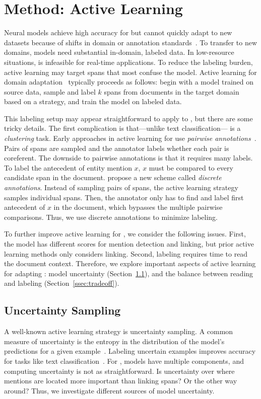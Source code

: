 \section{Method: Active Learning}
\label{sec:active}
Neural models achieve high accuracy for \ontonotes{} but cannot quickly
adapt to new datasets because of shifts in domain or
annotation standards~\citep{poot-2020}.
To transfer to new domains, models need substantial in-domain, labeled data.
In low-resource situations, \coref{} is infeasible for real-time
applications.
To reduce the labeling burden, active learning may
target spans that most confuse the model.
Active learning for domain adaptation~\citep{rai-2010} typically proceeds as follows:
begin with a model
trained on source data,
sample and label $k$ spans from
documents in the
target domain based on a strategy, and
train the model
on labeled data.

This labeling setup may appear straightforward to apply to \coref{}, but there are some tricky details.
The first complication is that---unlike text classification---\coref{} is a \emph{clustering} task.
Early approaches in active learning for \coref{} use \emph{pairwise
annotations}~\citep{miller-2012,sachan-2015}.
Pairs of spans are sampled and the annotator labels
whether each pair is coreferent.
The downside to pairwise annotations is that it requires many labels.
To label the antecedent
of entity mention $x$, $x$ must be compared to every
candidate span in the document. \citet{li-2020} propose a new scheme
called \emph{discrete annotations}.
Instead of sampling pairs of spans, the active learning strategy samples
individual spans.
Then, the annotator only has to find and label first antecedent of $x$ in the
document, which bypasses the multiple pairwise comparisons. Thus, we use
discrete annotations to minimize labeling.

To further improve active learning for \coref{}, we consider the following
issues.
First, the \coref{} model has different scores for mention detection and linking,
but prior active learning methods only considers linking. Second,
labeling \coref{} requires time to read the document context.
Therefore, we explore important aspects of active learning
 for adapting \coref{}: model uncertainty
(Section~\ref{ssec:uncertainty}), and the balance between reading and labeling
(Section~\ref{ssec:tradeoff}).


\subsection{Uncertainty Sampling}
\label{ssec:uncertainty}
A well-known active learning strategy is uncertainty sampling.
A common measure of uncertainty is the entropy in the distribution of the model's
predictions for a given example~\citep{lewis-1994}.
Labeling uncertain examples improves
accuracy for tasks like text classification~\citep{settles-2009}.
For \coref{}, models have multiple components, and computing uncertainty is not
as
straightforward.
Is uncertainty over where mentions are located more important than linking
spans?  Or the other way around?
Thus, we investigate different sources of \coref{}
model uncertainty.

